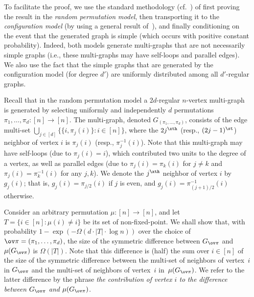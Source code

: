 To facilitate the proof,
we use the standard methodology (cf.~\cite[Apdx.~2]{E})
of first proving the result in the {\em random permutation model},
%
then transporting it to the {\em configuration model}\/
%
(by using a general result of~\cite{GJKW}),
and finally conditioning on the event that the generated graph
is simple (which occurs with positive constant probability).
Indeed, both models generate multi-graphs
that are not necessarily simple graphs
(i.e., these multi-graphs may have self-loops and parallel edges).
We also use the fact that the simple graphs that are
generated by the configuration model (for degree $d'$)
are uniformly distributed among all $d'$-regular graphs.

Recall that in the {\sf random permutation model}
a $2d$-regular $n$-vertex multi-graph is generated by selecting
uniformly and independently $d$ permutations $\pi_1,\ldots,\pi_d:[n]\to[n]$.
The multi-graph, denoted $G_{(\pi_1,\ldots,\pi_d)}$,
consists of the edge multi-set
$\bigcup_{j\in[d]}\{\{i,\pi_j(i)\}:i\in[n]\}$,
where the $2j^\xth$ (resp., $(2j-1)^\st$) neighbor of vertex $i$
is $\pi_j(i)$ (resp., $\pi_j^{-1}(i)$).
Note that this multi-graph may have self-loops (due to $\pi_j(i)=i$),
which contributed two units to the degree of a vertex,
as well as parallel edges
(due to $\pi_j(i)=\pi_k(i)$ for $j\neq k$
and $\pi_j(i)=\pi_k^{-1}(i)$ for any $j,k$).
We denote the $j^\xth$ neighbor of vertex $i$ by $g_j(i)$;
that is, $g_j(i)=\pi_{j/2}(i)$ if $j$ is even,
and $g_j(i)=\pi_{(j+1)/2}^{-1}(i)$ otherwise.
%

Consider an arbitrary permutation $\mu:[n]\to[n]$,
and let $T=\{i\!\in\![n]\!:\!\mu(i)\neq i\}$
be its set of non-fixed-point.
We shall show that,
with probability $1-\exp(-\Omega(d\cdot|T|\cdot\log n))$
over the choice of ${\ov\pi}=(\pi_1,\ldots,\pi_d)$,
the size of the symmetric difference
between $G_{\ov\pi}$ and $\mu(G_{\ov\pi})$ is $\Omega(|T|)$.
Note that this difference is (half) the sum over $i\in[n]$
of the size of the symmetric difference between the multi-set
of neighbors of vertex~$i$ in $G_{\ov\pi}$
and the multi-set of neighbors of vertex~$i$ in~$\mu(G_{\ov\pi})$.
We refer to the latter difference by the phrase
{\em the contribution of vertex $i$ to the difference
between $G_{\ov\pi}$ and $\mu(G_{\ov\pi})$}.

